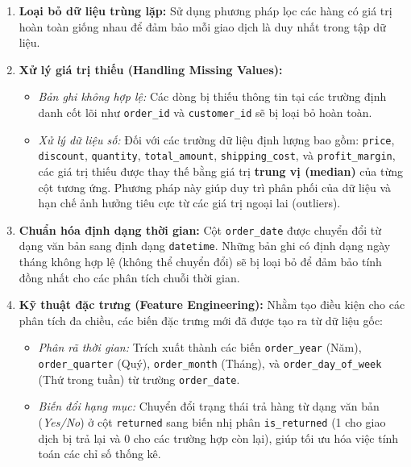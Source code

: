 \begin{enumerate}
    \item \textbf{Loại bỏ dữ liệu trùng lặp:} 
    Sử dụng phương pháp lọc các hàng có giá trị hoàn toàn giống nhau để đảm bảo mỗi giao dịch là duy nhất trong tập dữ liệu.
    
    \item \textbf{Xử lý giá trị thiếu (Handling Missing Values):}
    \begin{itemize}
        \item \textit{Bản ghi không hợp lệ:} Các dòng bị thiếu thông tin tại các trường định danh cốt lõi như \texttt{order\_id} và \texttt{customer\_id} sẽ bị loại bỏ hoàn toàn.
        \item \textit{Xử lý dữ liệu số:} Đối với các trường dữ liệu định lượng bao gồm: \texttt{price}, \texttt{discount}, \texttt{quantity}, \texttt{total\_amount}, \texttt{shipping\_cost}, và \texttt{profit\_margin}, các giá trị thiếu được thay thế bằng giá trị \textbf{trung vị (median)} của từng cột tương ứng. Phương pháp này giúp duy trì phân phối của dữ liệu và hạn chế ảnh hưởng tiêu cực từ các giá trị ngoại lai (outliers).
    \end{itemize}

    \item \textbf{Chuẩn hóa định dạng thời gian:}
    Cột \texttt{order\_date} được chuyển đổi từ dạng văn bản sang định dạng \texttt{datetime}. Những bản ghi có định dạng ngày tháng không hợp lệ (không thể chuyển đổi) sẽ bị loại bỏ để đảm bảo tính đồng nhất cho các phân tích chuỗi thời gian.

    \item \textbf{Kỹ thuật đặc trưng (Feature Engineering):}
    Nhằm tạo điều kiện cho các phân tích đa chiều, các biến đặc trưng mới đã được tạo ra từ dữ liệu gốc:
    \begin{itemize}
        \item \textit{Phân rã thời gian:} Trích xuất thành các biến \texttt{order\_year} (Năm), \texttt{order\_quarter} (Quý), \texttt{order\_month} (Tháng), và \texttt{order\_day\_of\_week} (Thứ trong tuần) từ trường \texttt{order\_date}.
        \item \textit{Biến đổi hạng mục:} Chuyển đổi trạng thái trả hàng từ dạng văn bản (\textit{Yes/No}) ở cột \texttt{returned} sang biến nhị phân \texttt{is\_returned} (1 cho giao dịch bị trả lại và 0 cho các trường hợp còn lại), giúp tối ưu hóa việc tính toán các chỉ số thống kê.
    \end{itemize}
\end{enumerate}


